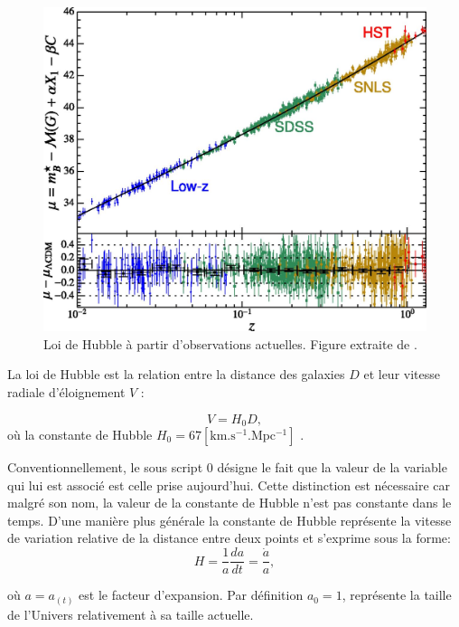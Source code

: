\begin{figure}[bth]
        \includegraphics[width=.9\linewidth]{img/01/hubble_law.jpg} 
        \caption[Loi de Hubble]{Loi de Hubble à partir d'observations actuelles. 
        Figure extraite de \citep{2015PNAS..112.3173B}.
        }
 		\label{fig:hubble_law}
\end{figure}

La loi de Hubble est la relation entre la distance des galaxies $D$ et leur vitesse radiale d'éloignement $V$ : %

\begin{equation}
V = H_0 D,
\end{equation}
où la constante de Hubble $H_0 = 67 \mathrm{ \left[ km.s^{-1}.Mpc^{-1} \right ] }$ \citep{planck_collaboration_planck_2016}.


Conventionnellement, le sous script $0$ désigne le fait que la valeur de la variable qui lui est associé est celle prise aujourd'hui.
Cette distinction est nécessaire car malgré son nom, la valeur de la constante de Hubble n'est pas constante dans le temps.
D'une manière plus générale la constante de Hubble représente la vitesse de variation relative de la distance entre deux points et s'exprime sous la forme:
\begin{equation}
H=\frac{1}{a} \frac{da}{dt} = \frac{\dot{a}}{a},
\end{equation}

où $a = a_{(t)}$ est le facteur d'expansion.
Par définition $a_0 = 1$,  représente la taille de l'Univers relativement à sa taille actuelle.

